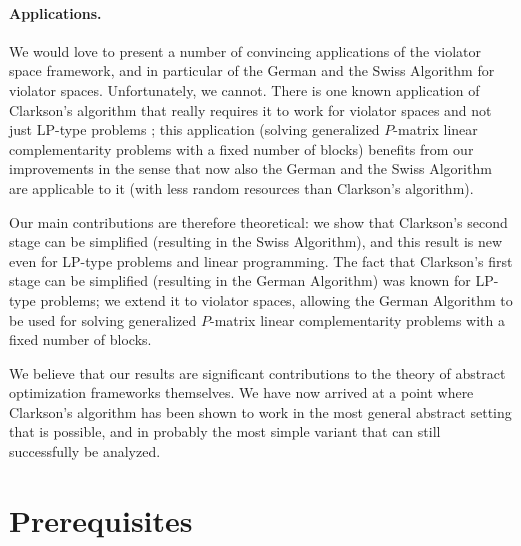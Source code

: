 \documentclass[12pt]{article}
\theoremstyle{remark}
\begin{document}
\paragraph{Applications.} 
We would love to present a number of convincing
applications of the violator space framework, and in particular of the
German and the Swiss Algorithm for violator spaces. Unfortunately, we
cannot. There is one known application of Clarkson's algorithm that
really requires it to work for violator spaces and not just LP-type
problems \cite{journals/dam/GartnerMRS08}; this application (solving
generalized $P$-matrix linear complementarity problems with a fixed
number of blocks) benefits from our improvements in the
sense that now also the German and the Swiss Algorithm are applicable
to it (with less random resources than Clarkson's algorithm).


Our main contributions are therefore theoretical: we show that
Clarkson's second stage can be simplified (resulting in the Swiss
Algorithm), and this result is new even for LP-type problems and
linear programming. The
fact that Clarkson's first stage can be simplified (resulting in the
German Algorithm) was known for LP-type problems; we extend it to
violator spaces, allowing the German Algorithm to be used for solving
generalized $P$-matrix linear complementarity problems with a fixed
number of blocks.

We  believe that our results are significant
contributions to the theory of abstract optimization frameworks
themselves. We have now arrived at a point where Clarkson's algorithm
has been shown to work in the most general abstract setting that is
possible, and in probably the most simple variant that can still
successfully be analyzed.



\section{Prerequisites}
\end{document}
